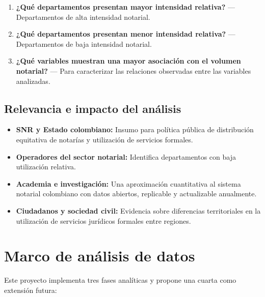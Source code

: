 \documentclass{article}
\begin{document}
\begin{enumerate}
    \item \textbf{¿Qué departamentos presentan mayor intensidad relativa?}
    — Departamentos de alta intensidad notarial.
    \item \textbf{¿Qué departamentos presentan menor intensidad relativa?}
    — Departamentos de baja intensidad notarial.
    \item \textbf{¿Qué variables muestran una mayor asociación con el volumen
    notarial?} — Para caracterizar las relaciones observadas
    entre las variables analizadas.
\end{enumerate}

\subsection{Relevancia e impacto del análisis}

\begin{itemize}
    \item \textbf{SNR y Estado colombiano:} Insumo para 
    política pública de distribución equitativa de notarías 
    y utilización de servicios formales.
    \item \textbf{Operadores del sector notarial:} Identifica 
    departamentos con baja utilización relativa.
    \item \textbf{Academia e investigación:} Una aproximación 
    cuantitativa al sistema notarial colombiano con datos 
    abiertos, replicable y actualizable anualmente.
    \item \textbf{Ciudadanos y sociedad civil:} Evidencia 
    sobre diferencias territoriales en la utilización de 
    servicios jurídicos formales entre regiones.
\end{itemize}

\newpage
\section{Marco de análisis de datos}

Este proyecto implementa tres fases analíticas y propone una cuarta
como extensión futura:
\end{document}
